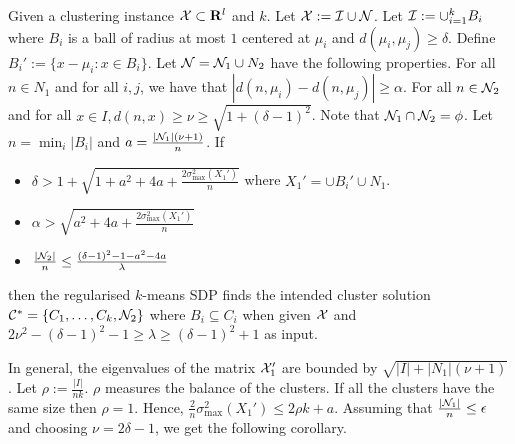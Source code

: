 \begin{theorem}
\label{a-thm:regSDPGeneral}
Given a clustering instance $\mathcal X \subset \mathbf R^l$ and $k$. Let $\mathcal X : = \mathcal I \cup \mathcal N$. Let $\mathcal I := \cup_{i=1}^k B_i$ where $B_i$ is a ball of radius at most $1$ centered at $\mu_i$ and $d(\mu_i, \mu_j) \ge \delta $. Define $B_i' := \{x - \mu_i : x \in B_i\}$. Let $\mathcal N = \mathcal N_1 \cup N_2$ have the following properties. For all $n \in N_1$ and for all $i, j$, we have that $| d(n, \mu_i) - d(n, \mu_j)| \ge \alpha$. For all $n \in \mathcal N_2$ and for all $x \in I, d(n, x) \ge \nu \ge \sqrt{1 + (\delta-1)^2}$. Note that $\mathcal N_1 \cap \mathcal N_2 = \phi$. Let $n = \min_i |B_i|$ and $a = \frac{|\mathcal N_1|(\nu+1)}{n}$. If  

\begin{itemize}
  \item $\delta > 1 + \sqrt{1+ a^2 + 4a + \frac{2\sigma_{\max}^2(X_1')}{n}}$ where $ X_1' = \cup B_i' \cup N_1$.
  \item $\alpha > \sqrt{a^2 + 4a + \frac{2\sigma_{\max}^2(X_1')}{n}}$ 
  \item $\frac{|\mathcal N_2|}{n} \le \frac{(\delta-1)^2-1-a^2-4a}{\lambda}$
\end{itemize}
then the regularised $k$-means SDP finds the intended cluster solution  $\mathcal C^* = \{C_1, \ldots, C_k, \mathcal N_2\}$ where $B_i \subseteq C_i$ when given $\mathcal X$ and $2\nu^2 - (\delta-1)^2 - 1 \ge \lambda \ge (\delta-1)^2 + 1$ as input.
\end{theorem}

\noindent In general, the eigenvalues of the matrix $\mathcal X_1'$ are bounded by $\sqrt{|I| + |N_1|(\nu+1)}$. Let $\rho := \frac{|I|}{nk}$. $\rho$ measures the balance of the clusters. If all the clusters have the same size then $\rho = 1$. Hence, $\frac{2}{n}\sigma^2_{\max}(X_1') \le 2\rho k + a$. Assuming that $\frac{|\mathcal N_1|}{n} \le \epsilon$ and choosing $\nu = 2\delta - 1$, we get the following corollary.
 
